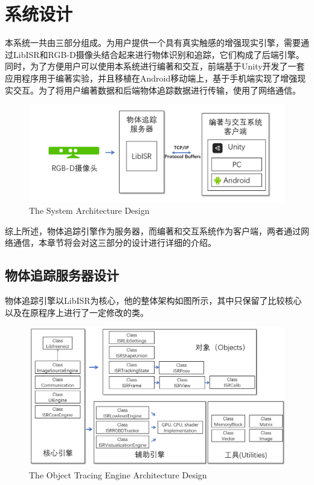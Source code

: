 \chapter{系统设计}
\label{design}

本系统一共由三部分组成。为用户提供一个具有真实触感的增强现实引擎，需要通过LibISR和RGB-D摄像头结合起来进行物体识别和追踪，它们构成了后端引擎。同时，为了方便用户可以使用本系统进行编著和交互，前端基于Unity开发了一套应用程序用于编著实验，并且移植在Android移动端上，基于手机端实现了增强现实交互。为了将用户编著数据和后端物体追踪数据进行传输，使用了网络通信。

\begin{figure}[!htp]
  \centering
  \includegraphics[width=12cm]{figure/TotalArc.png}
    {The System Architecture Design}
 \label{fig:totalarc}
\end{figure}

综上所述，物体追踪引擎作为服务器，而编著和交互系统作为客户端，两者通过网络通信，本章节将会对这三部分的设计进行详细的介绍。

\section{物体追踪服务器设计}

物体追踪引擎以LibISR为核心\cite{Ren_3DV_2014, star3d_iccv_2013}，他的整体架构如图所示，其中只保留了比较核心以及在原程序上进行了一定修改的类。

\begin{figure}[!htp]
  \centering
  \includegraphics[width=12cm]{figure/LibArc.png}
    {The Object Tracing Engine Architecture Design}
 \label{fig:labarc}
\end{figure}

